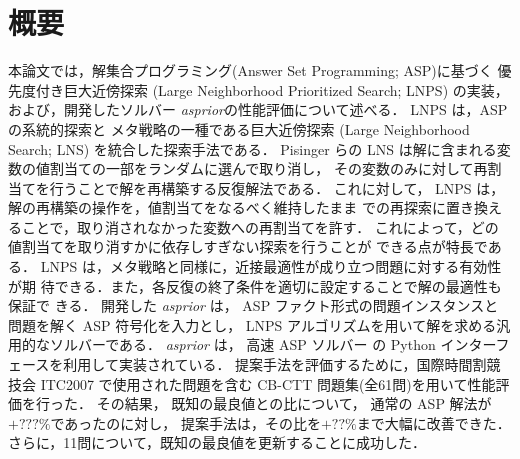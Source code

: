 \chapter*{概要}


本論文では，解集合プログラミング(Answer Set Programming; ASP)に基づく
優先度付き巨大近傍探索 (Large Neighborhood Prioritized Search; LNPS)
の実装，および，開発したソルバー \textit{asprior}の性能評価について述べる．
%
LNPS は，ASP の系統的探索と
メタ戦略の一種である巨大近傍探索
(Large Neighborhood Search; LNS)
を統合した探索手法である．
%
Pisinger らの LNS は解に含まれる変数の値割当ての一部をランダムに選んで取り消し，
その変数のみに対して再割当てを行うことで解を再構築する反復解法である．
これに対して，
LNPS は，解の再構築の操作を，値割当てをなるべく維持したまま
での再探索に置き換えることで，取り消されなかった変数への再割当てを許す．
これによって，どの値割当てを取り消すかに依存しすぎない探索を行うことが
できる点が特長である．
LNPS は，メタ戦略と同様に，近接最適性が成り立つ問題に対する有効性が期
待できる．また，各反復の終了条件を適切に設定することで解の最適性も保証で
きる．
開発した \textit{asprior} は，
ASP ファクト形式の問題インスタンスと
問題を解く ASP 符号化を入力とし，
LNPS アルゴリズムを用いて解を求める汎用的なソルバーである．
\textit{asprior} は，
高速 ASP ソルバー {\clingo}
の Python インターフェースを利用して実装されている．
%
提案手法を評価するために，国際時間割競技会 ITC2007
で使用された問題を含む CB-CTT 問題集(全61問)を用いて性能評価を行った．
その結果，
既知の最良値との比について，
通常の ASP 解法が$+???\%$であったのに対し，
提案手法は，その比を$+??\%$まで大幅に改善できた．
さらに，11問について，既知の最良値を更新することに成功した．

